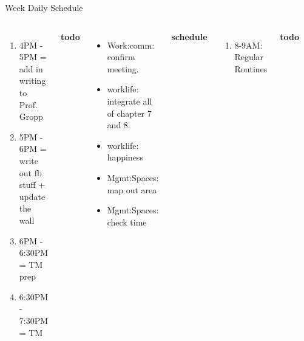 \documentclass[serif, mathserif, final]{beamer}
\newcommand{\timeEst}[1]{\textit{Time:} \textit{#1}}
\newcommand{\priority}[1]{\textit{Priority:} \textit{#1}}
\newcommand{\deadline}[1]{#1}
\begin{document}
\begin{frame}{}
\begin{columns}
\begin{column}{0.50\linewidth}
\begin{block}{Week Daily Schedule}
\begin{columns}
\begin{enumerate}
            \tiny \item \tiny 4PM - 5PM  = add in writing to
            Prof. Gropp 
            \tiny \item \tiny 5PM - 6PM = write out fb stuff + update
            the wall 
            \tiny \item \tiny 6PM - 6:30PM = TM prep 
            \tiny \item \tiny 6:30PM - 7:30PM = TM 
          \end{enumerate} 
          \textbf{\small todo}\\
          \begin{itemize} 
            \tiny \item \tiny Work:comm: confirm meeting. 
          \item \tiny worklife: integrate all of chapter 7 and 8. 
          \item \tiny worklife: happiness 
          \item \tiny Mgmt:Spaces: map out area 
          \item \tiny Mgmt:Spaces: check time 
          \end{itemize}
          \textbf{\small schedule}\\
          \begin{enumerate} 
            \tiny \item \tiny 8-9AM: Regular Routines 
          \end{enumerate} 
          
          \textbf{\small todo}\\ 
          \begin{itemize}
            \tiny \item \tiny -  \deadline{ }   \timeEst{} \priority{} 
          \end{itemize}
          \textbf{\small schedule}\\
          \begin{enumerate}
            \tiny \item \tiny 8-9AM: Regular Routines 
          \end{enumerate}
          

\end{columns}
\end{block}
\end{column}
\end{columns}
\end{frame}
\end{document}
